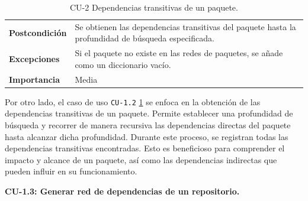 \begin{table}[p]
\begin{tabularx}{\linewidth}{ p{} p{} }
		\textbf{Postcondición}        & Se obtienen las dependencias transitivas del paquete hasta la profundidad de búsqueda especificada.    \\
		\textbf{Excepciones}          & Si el paquete no existe en las redes de paquetes, se añade como un diccionario vacío.                  \\
		\textbf{Importancia}          & Media                                                                                                  \\
		\bottomrule
	\end{tabularx}
	\caption{CU-2 Dependencias transitivas de un paquete.}
	\label{tab:cu2}
\end{table}

Por otro lado, el caso de uso \texttt{CU-1.2} \ref{tab:cu2} se enfoca en la obtención de las dependencias transitivas de un paquete.
Permite establecer una profundidad de búsqueda y recorrer de manera recursiva las dependencias directas del
paquete hasta alcanzar dicha profundidad. Durante este proceso, se registran todas las dependencias transitivas
encontradas. Esto es beneficioso para comprender el impacto y alcance de un paquete, así como las dependencias
indirectas que pueden influir en su funcionamiento.


\textbf{CU-1.3: Generar red de dependencias de un repositorio.}

